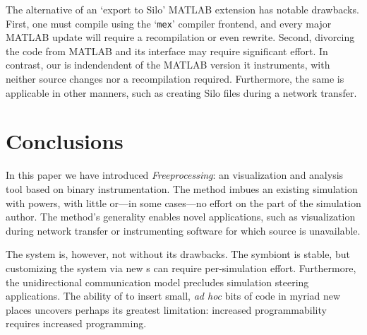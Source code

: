 The alternative of an `export to Silo' MATLAB extension has notable
drawbacks. First, one must compile using the `\texttt{mex}' compiler
frontend, and every major MATLAB update will require a recompilation or
even rewrite.  Second, divorcing the code from MATLAB and its interface
may require significant effort.
In contrast, our \freeprocessor{} is indendendent of the MATLAB version
it instruments, with neither source changes nor a recompilation
required.
Furthermore, the same \freeprocessor{} is applicable in other manners,
such as creating Silo files during a network transfer.

%
%

\section{Conclusions}
\label{sec:conclusion}

In this paper we have introduced \textit{Freeprocessing}: an \insitu{}
visualization and analysis tool based on binary instrumentation.  The
method imbues
an existing simulation with \insitu{} powers, with little or---in
some cases---no effort on the part of the simulation author.  The
method's generality enables novel applications, such as visualization
during network transfer or instrumenting software for which source is
unavailable.

The system is, however, not without its drawbacks.  The symbiont
is stable, but customizing the system via new
\freeprocessor{}s can require per-simulation effort.  Furthermore,
the unidirectional communication model precludes simulation steering
applications.
The ability of \freeprocessing{} to insert small,
\textit{ad hoc} bits of code in myriad new places uncovers perhaps
its greatest limitation: increased programmability requires increased
programming.

